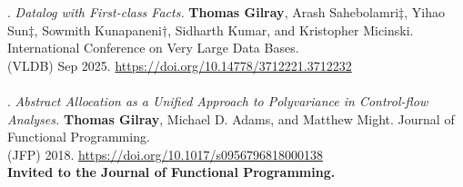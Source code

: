\paper. \textit{Datalog with First-class Facts.}
\textbf{Thomas Gilray}, Arash Sahebolamri$\ddagger$, Yihao Sun$\ddagger$, Sowmith Kunapaneni$\dagger$, Sidharth Kumar, and Kristopher Micinski.
International Conference on Very Large Data Bases.
\\(VLDB) Sep 2025. \url{https://doi.org/10.14778/3712221.3712232}
\\ \vspace{-0.1cm}\\
\paper. \textit{Abstract Allocation as a Unified Approach to Polyvariance in Control-flow Analyses.}
\textbf{Thomas Gilray}, Michael D. Adams, and Matthew Might.
Journal of Functional Programming.
\\(JFP) 2018. \url{https://doi.org/10.1017/s0956796818000138}
\\\textbf{Invited to the Journal of Functional Programming.} \\ \vspace{-0.1cm}\\

